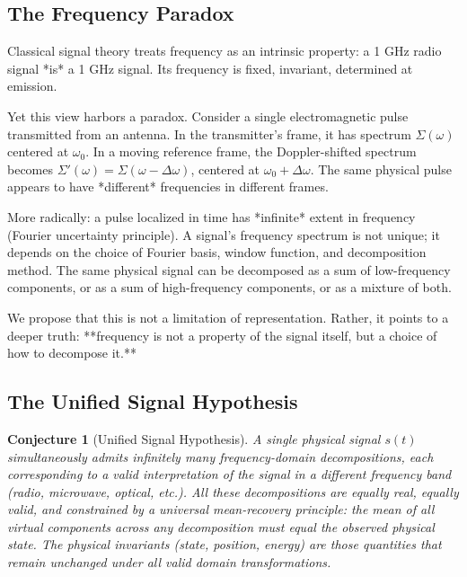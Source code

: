 \documentclass[twocolumn,11pt,a4paper]{article}
\newtheorem{conjecture}{Conjecture}
\newcommand{\signal}{s}
\newcommand{\spectrum}{\Sigma}
\newcommand{\freq}{\omega}
\begin{document}
\subsection{The Frequency Paradox}

Classical signal theory treats frequency as an intrinsic property: a 1 GHz radio signal *is* a 1 GHz signal. Its frequency is fixed, invariant, determined at emission.

Yet this view harbors a paradox. Consider a single electromagnetic pulse transmitted from an antenna. In the transmitter's frame, it has spectrum $\spectrum(\freq)$ centered at $\freq_0$. In a moving reference frame, the Doppler-shifted spectrum becomes $\spectrum'(\freq) = \spectrum(\freq - \Delta\freq)$, centered at $\freq_0 + \Delta\freq$. The same physical pulse appears to have *different* frequencies in different frames.

More radically: a pulse localized in time has *infinite* extent in frequency (Fourier uncertainty principle). A signal's frequency spectrum is not unique; it depends on the choice of Fourier basis, window function, and decomposition method. The same physical signal can be decomposed as a sum of low-frequency components, or as a sum of high-frequency components, or as a mixture of both.

We propose that this is not a limitation of representation. Rather, it points to a deeper truth: **frequency is not a property of the signal itself, but a choice of how to decompose it.**

\subsection{The Unified Signal Hypothesis}

\begin{conjecture}[Unified Signal Hypothesis]
\label{conj:unified}
A single physical signal $\signal(t)$ simultaneously admits infinitely many frequency-domain decompositions, each corresponding to a valid interpretation of the signal in a different frequency band (radio, microwave, optical, etc.). All these decompositions are equally real, equally valid, and constrained by a universal mean-recovery principle: the mean of all virtual components across any decomposition must equal the observed physical state. The physical invariants (state, position, energy) are those quantities that remain unchanged under all valid domain transformations.
\end{conjecture}
\end{document}
